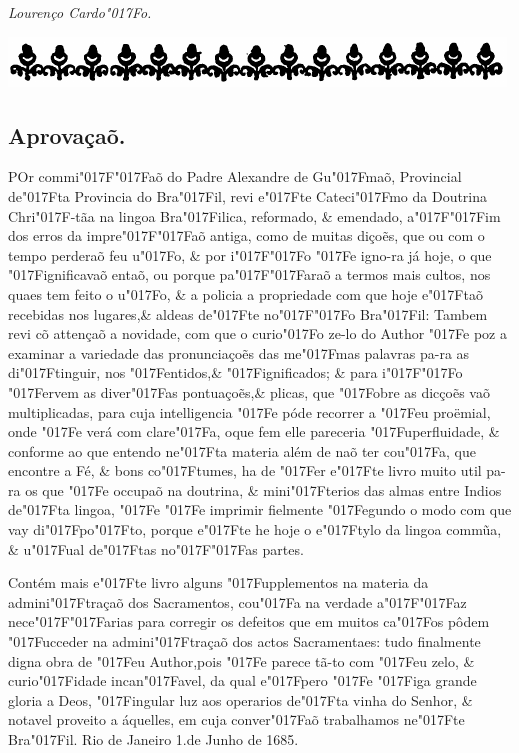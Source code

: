 \documentclass[openany,titlepage,12pt]{book}
\newcommand{\lgS}{\char"017F}
\newcommand{\lgSS}{\char"017F\char"017F}
\begin{document}
\begin{center}
    \hspace{60pt}\textit{Lourenço Cardo\lgS o.}
\end{center}
\newpage

\begin{center}
    \includegraphics[scale=0.33]{05.aprovacao3.png}
\end{center}
\subsection{Aprovaçaõ.}
\vspace*{12pt}

\lettrine[findent=2pt, nindent=0pt, lines=2]
{P}{O}r commi\lgSS aõ do Padre Alexandre de Gu\lgS maõ,
Provincial de\lgS ta Provincia\linebreak
 do Bra\lgS il, revi e\lgS te Cateci\lgS mo 
da Doutrina Chri\lgS -tãa na lingoa Bra\lgS ilica, reformado, \&
emendado, a\lgSS im dos erros da impre\lgSS aõ antiga, como de
muitas diçoẽs, que ou com o tempo perderaõ feu u\lgS o, \& por
i\lgSS o \lgS e igno-ra já hoje, o que \lgS ignificavaõ entaõ,
ou porque pa\lgSS araõ a termos mais cultos, nos quaes tem feito
o u\lgS o, \& a policia a propriedade com que hoje e\lgS taõ
recebidas nos lugares,\& aldeas de\lgS te no\lgSS o Bra\lgS il:
Tambem revi cõ attençaõ a novidade, com que o curio\lgS o ze-lo do
Author \lgS e poz a examinar a variedade das pronunciaçoẽs das
me\lgS mas palavras pa-ra as di\lgS tinguir, nos \lgS entidos,\&
\lgS ignificados; \& para i\lgSS o \lgS ervem as diver\lgS as
pontuaçoẽs,\& plicas, que \lgS obre as dicçoẽs vaõ multiplicadas,
para cuja intelligencia \lgS e póde recorrer\linebreak
a \lgS eu proëmial, onde \lgS e verá com
clare\lgS a, o\linebreak que fem elle pareceria
\lgS uperfluidade, \& conforme ao que entendo ne\lgS ta materia
além de naõ ter cou\lgS a, que encontre a Fé, \& bons co\lgS tumes,
ha de \lgS er e\lgS te livro muito util pa-ra os que \lgS e occupaõ na
doutrina, \& mini\lgS terios das almas entre Indios de\lgS ta lingoa,
\lgS e \lgS e imprimir fielmente \lgS egundo o modo com que vay
di\lgS po\lgS to, porque e\lgS te he hoje o e\lgS tylo da lingoa
commũa, \& u\lgS ual de\lgS tas no\lgSS as partes.

Contém mais e\lgS te livro alguns \lgS upplementos na materia da
admini\lgS traçaõ dos Sacramentos, cou\lgS a na verdade a\lgSS az
nece\lgSS arias para corregir os defeitos que em muitos ca\lgS os
pôdem \lgS ucceder na admini\lgS traçaõ dos actos Sacramentaes:
tudo finalmente digna obra de \lgS eu Author,pois \lgS e parece
tã-to com \lgS eu zelo, \& curio\lgS idade incan\lgS avel, da qual
e\lgS pero \lgS e \lgS iga grande gloria a Deos, \lgS ingular luz
aos operarios de\lgS ta vinha do Senhor, \& notavel proveito a áquelles, em
cuja conver\lgS aõ trabalhamos ne\lgS te Bra\lgS il.
Rio de Janeiro 1.de Junho de 1685.
\end{document}
